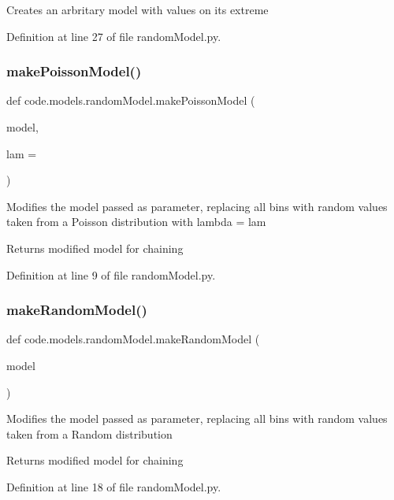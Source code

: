 \begin{DoxyVerb}Creates an arbritary model with values on its extreme
\end{DoxyVerb}
 

Definition at line 27 of file random\+Model.\+py.

\mbox{\label{namespacecode_1_1models_1_1random_model_a53965ea5d04003536da24d54238b7b4e}} 
\subsubsection{\texorpdfstring{make\+Poisson\+Model()}{makePoissonModel()}}
{\footnotesize\ttfamily def code.\+models.\+random\+Model.\+make\+Poisson\+Model (\begin{DoxyParamCaption}\item[{}]{model,  }\item[{}]{lam = {} }\end{DoxyParamCaption})}

\begin{DoxyVerb}Modifies the model passed as parameter, replacing all bins 
with random values taken from a Poisson distribution with lambda = lam

Returns modified model for chaining\end{DoxyVerb}
 

Definition at line 9 of file random\+Model.\+py.

\mbox{\label{namespacecode_1_1models_1_1random_model_aacad6bd46fc822773672369bd2b96304}} 
\subsubsection{\texorpdfstring{make\+Random\+Model()}{makeRandomModel()}}
{\footnotesize\ttfamily def code.\+models.\+random\+Model.\+make\+Random\+Model (\begin{DoxyParamCaption}\item[{}]{model }\end{DoxyParamCaption})}

\begin{DoxyVerb}Modifies the model passed as parameter, replacing all bins 
with random values taken from a Random distribution

Returns modified model for chaining\end{DoxyVerb}
 

Definition at line 18 of file random\+Model.\+py.

